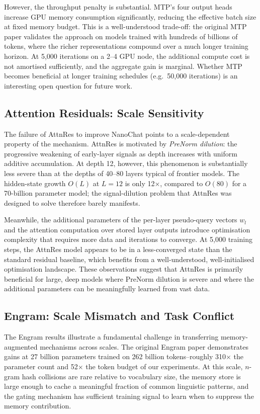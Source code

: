 However, the throughput penalty is substantial.
MTP's four output heads increase GPU memory consumption significantly, reducing the effective
batch size at fixed memory budget.
This is a well-understood trade-off: the original MTP paper validates the approach on models
trained with hundreds of billions of tokens, where the richer representations compound over a
much longer training horizon.
At 5{,}000 iterations on a 2--4 GPU node, the additional compute cost is not amortised
sufficiently, and the aggregate gain is marginal.
Whether MTP becomes beneficial at longer training schedules (e.g.\ 50{,}000 iterations) is an
interesting open question for future work.

\subsection{Attention Residuals: Scale Sensitivity}

The failure of AttnRes to improve NanoChat points to a scale-dependent property of the mechanism.
AttnRes is motivated by \emph{PreNorm dilution}: the progressive weakening of early-layer signals
as depth increases with uniform additive accumulation.
At depth 12, however, this phenomenon is substantially less severe than at the depths of 40--80
layers typical of frontier models.
The hidden-state growth $O(L)$ at $L=12$ is only 12$\times$, compared to $O(80)$ for a
70-billion parameter model; the signal-dilution problem that AttnRes was designed to solve
therefore barely manifests.

Meanwhile, the additional parameters of the per-layer pseudo-query vectors $w_l$ and the
attention computation over stored layer outputs introduce optimisation complexity that requires
more data and iterations to converge.
At 5{,}000 training steps, the AttnRes model appears to be in a less-converged state than the
standard residual baseline, which benefits from a well-understood, well-initialised optimisation
landscape.
These observations suggest that AttnRes is primarily beneficial for large, deep models where
PreNorm dilution is severe and where the additional parameters can be meaningfully learned from
vast data.

\subsection{Engram: Scale Mismatch and Task Conflict}

The Engram results illustrate a fundamental challenge in transferring memory-augmented mechanisms
across scales.
The original Engram paper \parencite{cheng2026conditional} demonstrates gains at 27 billion
parameters trained on 262 billion tokens--roughly 310$\times$ the parameter count and
52$\times$ the token budget of our experiments.
At this scale, \(n\)-gram hash collisions are rare relative to vocabulary size, the memory store is
large enough to cache a meaningful fraction of common linguistic patterns, and the gating
mechanism has sufficient training signal to learn when to suppress the memory contribution.

